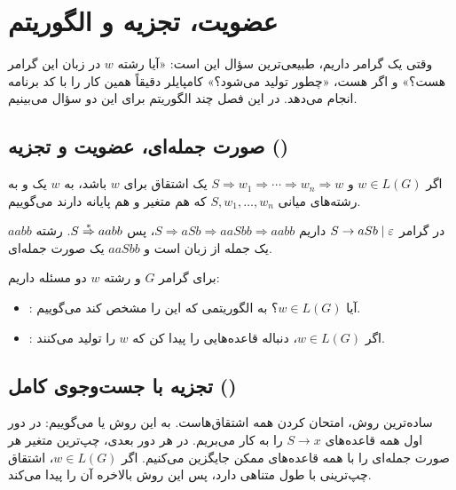 \chapter{عضویت، تجزیه و الگوریتم }

وقتی یک گرامر داریم، طبیعی‌ترین سؤال این است: «آیا رشته $w$ در زبان این گرامر هست؟» و اگر هست، «چطور تولید می‌شود؟» کامپایلر دقیقاً همین کار را با کد برنامه انجام می‌دهد. در این فصل چند الگوریتم برای این دو سؤال می‌بینیم.

\section{صورت جمله‌ای، عضویت و تجزیه ()}

\begin{definition}
اگر $w\in L(G)$ و $S\Rightarrow w_1\Rightarrow\cdots\Rightarrow w_n\Rightarrow w$ یک اشتقاق برای $w$ باشد، به $w$ یک  و به رشته‌های میانی $S,w_1,\dots,w_n$ که هم متغیر و هم پایانه دارند  می‌گوییم.
\end{definition}

\begin{example}
در گرامر $S\to aSb\mid\varepsilon$ داریم $S\Rightarrow aSb\Rightarrow aaSbb\Rightarrow aabb$، پس $S\overset{*}{\Rightarrow} aabb$. رشته $aabb$ یک جمله از زبان است و $aaSbb$ یک صورت جمله‌ای.
\end{example}

برای گرامر $G$ و رشته $w$ دو مسئله داریم:
\begin{itemize}
\item {}: آیا $w\in L(G)$؟ به الگوریتمی که این را مشخص کند  می‌گوییم.
\item {}: اگر $w\in L(G)$، دنباله قاعده‌هایی را پیدا کن که $w$ را تولید می‌کنند.
\end{itemize}

\section{تجزیه با جست‌وجوی کامل ()}

ساده‌ترین روش، امتحان کردن همه اشتقاق‌هاست. به این روش  یا  می‌گوییم: در دور اول همه قاعده‌های $S\to x$ را به کار می‌بریم. در هر دور بعدی، چپ‌ترین متغیر هر صورت جمله‌ای را با همه قاعده‌های ممکن جایگزین می‌کنیم. اگر $w\in L(G)$، اشتقاق چپ‌ترینی با طول متناهی دارد، پس این روش بالاخره آن را پیدا می‌کند.

